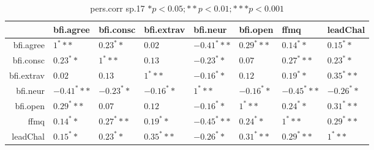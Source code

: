 \begin{table}[ht]
\centering
\begin{tabular}{rlllllll}
  \hline
 & bfi.agree & bfi.consc & bfi.extrav & bfi.neur & bfi.open & ffmq & leadChal \\ 
  \hline
bfi.agree & $1^***$ & $0.23^**$ & $0.02$ & $-0.41^***$ & $0.29^***$ & $0.14^**$ & $0.15^**$ \\ 
  bfi.consc & $0.23^**$ & $1^***$ & $0.13$ & $-0.23^**$ & $0.07$ & $0.27^***$ & $0.23^**$ \\ 
  bfi.extrav & $0.02$ & $0.13$ & $1^***$ & $-0.16^**$ & $0.12$ & $0.19^**$ & $0.35^***$ \\ 
  bfi.neur & $-0.41^***$ & $-0.23^**$ & $-0.16^**$ & $1^***$ & $-0.16^**$ & $-0.45^***$ & $-0.26^**$ \\ 
  bfi.open & $0.29^***$ & $0.07$ & $0.12$ & $-0.16^**$ & $1^***$ & $0.24^**$ & $0.31^***$ \\ 
  ffmq & $0.14^**$ & $0.27^***$ & $0.19^**$ & $-0.45^***$ & $0.24^**$ & $1^***$ & $0.29^***$ \\ 
  leadChal & $0.15^**$ & $0.23^**$ & $0.35^***$ & $-0.26^**$ & $0.31^***$ & $0.29^***$ & $1^***$ \\ 
   \hline
\end{tabular}
\caption{pers.corr sp.17 $* p < 0.05; ** p < 0.01; *** p < 0.001$} 
\end{table}
